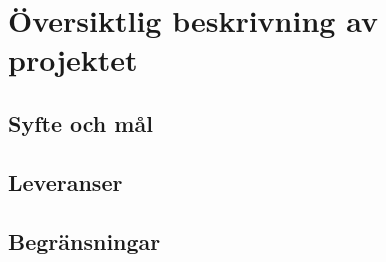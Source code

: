 \documentclass[projektplan/plan.tex]{subfiles}
\begin{document}
\section{Översiktlig beskrivning av projektet}
\subsection{Syfte och mål}
\subsection{Leveranser}
\subsection{Begränsningar}
\end{document}
